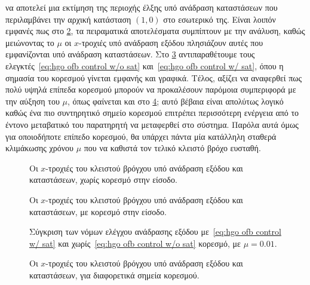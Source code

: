 να αποτελεί μια εκτίμηση της περιοχής έλξης υπό ανάδραση καταστάσεων που περιλαμβάνει την αρχική κατάσταση $(1,0)$ στο εσωτερικό της. Είναι λοιπόν εμφανές πως στο \cref{fig:hgo_sfb_ofb_mu_comparison_sat}, τα πειραματικά αποτελέσματα συμπίπτουν με την ανάλυση, καθώς μειώνοντας το $\mu$ οι $x$-τροχιές υπό ανάδραση εξόδου πλησιάζουν αυτές που εμφανίζονται υπό ανάδραση καταστάσεων. Στο \cref{fig:hgo_u_comparison} αντιπαραθέτουμε τους ελεγκτές~\eqref{eq:hgo ofb control w/o sat} και~\eqref{eq:hgo ofb control w/ sat}, όπου η σημασία του κορεσμού γίνεται εμφανής και γραφικά. Τέλος, αξίζει να αναφερθεί πως πολύ υψηλά επίπεδα κορεσμού μπορούν να προκαλέσουν παρόμοια συμπεριφορά με την αύξηση του $\mu$, όπως φαίνεται και στο \cref{fig:hgo_sfb_ofb_sat_comparison}; αυτό βέβαια είναι απολύτως λογικό καθώς ένα πιο συντηρητικό σημείο κορεσμού επιτρέπει περισσότερη ενέργεια από το έντονο μεταβατικό του παρατηρητή να μεταφερθεί στο σύστημα. Παρόλα αυτά όμως για οποιοδήποτε επίπεδο κορεσμού, θα υπάρχει πάντα μία κατάλληλη σταθερά κλιμάκωσης χρόνου $\mu$ που να καθιστά τον τελικό κλειστό βρόχο ευσταθή.

\begin{figure}[t]
    \centering
    
    \caption{Οι $x$-τροχιές του κλειστού βρόγχου υπό ανάδραση εξόδου και καταστάσεων, χωρίς κορεσμό στην είσοδο.}
    \label{fig:hgo_sfb_ofb_mu_comparison_no_sat}
\end{figure}

\begin{figure}[t]
    \centering
    
    \caption{Οι $x$-τροχιές του κλειστού βρόγχου υπό ανάδραση εξόδου και καταστάσεων, με κορεσμό στην είσοδο.}
    \label{fig:hgo_sfb_ofb_mu_comparison_sat}
\end{figure}

\begin{figure}[t]
    \centering
    
    \caption{Σύγκριση των νόμων ελέγχου ανάδρασης εξόδου με~\eqref{eq:hgo ofb control w/ sat} και χωρίς~\eqref{eq:hgo ofb control w/o sat} κορεσμό, με $\mu = 0.01$.}
    \label{fig:hgo_u_comparison}
\end{figure}

\begin{figure}[t]
    \centering
    
    \caption{Οι $x$-τροχιές του κλειστού βρόγχου υπό ανάδραση εξόδου και καταστάσεων, για διαφορετικά σημεία κορεσμού.}
    \label{fig:hgo_sfb_ofb_sat_comparison}
\end{figure}

